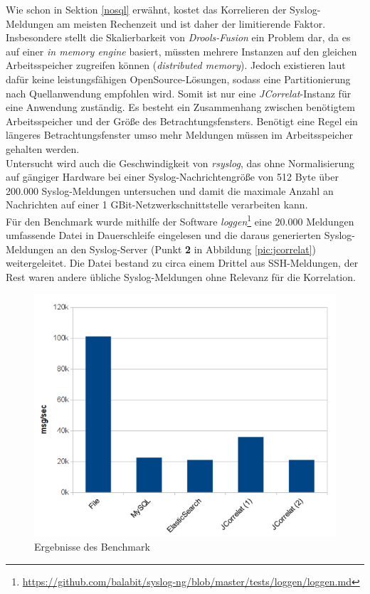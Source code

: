 Wie schon in Sektion \ref{nosql} erwähnt, kostet das Korrelieren der Syslog-Meldungen am 
meisten Rechenzeit und ist daher der limitierende Faktor. Insbesondere stellt die 
Skalierbarkeit von \textit{Drools-Fusion} ein Problem dar, da es auf einer \textit{in 
memory engine} basiert, müssten mehrere Instanzen auf den gleichen Arbeitsspeicher 
zugreifen können (\textit{distributed memory}).
Jedoch existieren laut \cite{reissmann} dafür keine 
leistungsfähigen OpenSource-Lösungen, sodass eine Partitionierung nach Quellanwendung 
empfohlen wird. Somit ist nur eine \textit{JCorrelat}-Instanz für eine Anwendung 
zuständig. Es besteht ein Zusammenhang zwischen benötigtem Arbeitsspeicher und der Größe 
des Betrachtungsfensters. Benötigt eine Regel ein längeres Betrachtungsfenster umso mehr 
Meldungen müssen im Arbeitsspeicher gehalten werden.\\
Untersucht wird auch die Geschwindigkeit von \textit{rsyslog}, das ohne Normalisierung 
auf gängiger Hardware bei einer Syslog-Nachrichtengröße von 512 Byte über 200.000 
Syslog-Meldungen untersuchen und damit die maximale Anzahl an Nachrichten auf einer 
1 GBit-Netzwerkschnittstelle verarbeiten kann.\\

Für den Benchmark wurde mithilfe der Software 
\textit{loggen}\footnote{\url{https://github.com/balabit/syslog-ng/blob/master/tests/loggen/loggen.md}}
 eine 20.000 Meldungen umfassende Datei in Dauerschleife eingelesen und die daraus 
generierten Syslog-Meldungen an den Syslog-Server (Punkt \textbf{2} in Abbildung 
\ref{pic:jcorrelat}) weitergeleitet. Die Datei bestand zu circa einem Drittel aus 
SSH-Meldungen, der Rest waren andere übliche Syslog-Meldungen ohne Relevanz für die 
Korrelation.

\begin{figure}[htbp]
    \caption{Ergebnisse des Benchmark}
    \label{pic:benchmark}\vspace{0.2cm}
    \centering
    \includegraphics[scale=0.46]{img/benchmark}  
\end{figure}

